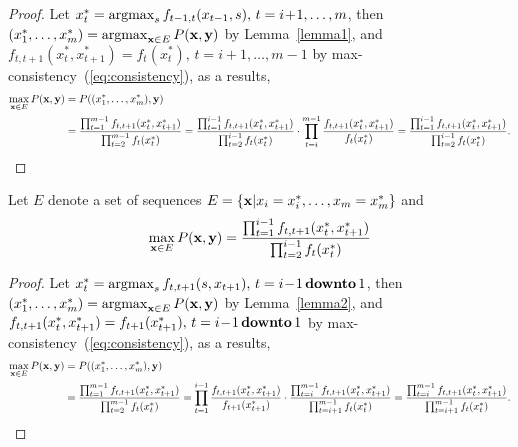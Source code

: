 \begin{proof}
Let $x_t^* = \operatorname*{argmax}_{s} f_{t-1, t}(x_{t-1}, s), \, t = i\!+\!1,\dots,m$, 
then $(x_1^*,\dots,x_m^*) = \operatorname*{argmax}_{\mathbf{x} \in E} P(\mathbf{x},\mathbf{y})$ by Lemma~\ref{lemma1},
and $f_{t,t+1}(x_t^*, x_{t+1}^*) = f_{t}(x_t^*), \, t = i\!+\!1,\dots,m\!-\!1$ by max-consistency~(\ref{eq:consistency}),
as a results,
\begin{align*}
\max_{\x \in E} P(\x,\y) &= P((x_1^*,\dots,x_m^*), \y) \\
&= \frac{\prod_{t=1}^{m-1} f_{t,t+1}(x_t^*, x_{t+1}^*)} {\prod_{t=2}^{m-1} f_t(x_t^*)} %
= \frac{\prod_{t=1}^{i-1} f_{t,t+1}(x_t^*, x_{t+1}^*)} {\prod_{t=2}^{i-1} f_t(x_t^*)} \cdot
  \prod_{t=i}^{m-1} \frac{f_{t,t+1}(x_t^*, x_{t+1}^*)} {f_t(x_t^*)}                   %
= \frac{\prod_{t=1}^{i-1} f_{t,t+1}(x_t^*, x_{t+1}^*)} {\prod_{t=2}^{i-1} f_t(x_t^*)}.
\end{align*}
\end{proof}

\begin{lemma}
\label{lemma4}
Let $E$ denote a set of sequences $E = \{\mathbf{x} |x_i = x_i^*, \dots, x_m = x_m^*\}$ and
\begin{equation*}
\max_{\mathbf{x} \in E} P(\mathbf{x},\mathbf{y}) = \frac{\prod_{t=1}^{i-1} f_{t,t+1}(x_t^*, x_{t+1}^*)} {\prod_{t=2}^{i-1} f_t(x_t^*)}
\end{equation*}
\end{lemma}

\begin{proof}
Let $x_t^* = \operatorname*{argmax}_{s} f_{t, t+1}(s, x_{t+1}), \, t = i\!-\!1 \,\textbf{downto}\, 1$, 
then $(x_1^*,\dots,x_m^*) = \operatorname*{argmax}_{\mathbf{x} \in E} P(\mathbf{x},\mathbf{y})$ by Lemma~\ref{lemma2},
and $f_{t,t+1}(x_t^*, x_{t+1}^*) = f_{t+1}(x_{t+1}^*),\,t = i\!-\!1 \,\textbf{downto}\, 1$ by max-consistency~(\ref{eq:consistency}),
as a results,
\begin{align*}
\max_{\x \in E} P(\x,\y) &= P((x_1^*,\dots,x_m^*), \y) \\
&= \frac{\prod_{t=1}^{m-1} f_{t,t+1}(x_t^*, x_{t+1}^*)} {\prod_{t=2}^{m-1} f_t(x_t^*)} %
= \prod_{t=1}^{i-1} \frac{f_{t,t+1}(x_t^*, x_{t+1}^*)} {f_{t+1}(x_{t+1}^*)}  \cdot
  \frac{\prod_{t=i}^{m-1} f_{t,t+1}(x_t^*, x_{t+1}^*)} {\prod_{t=i+1}^{m-1} f_t(x_t^*)} 
= \frac{\prod_{t=i}^{m-1} f_{t,t+1}(x_t^*, x_{t+1}^*)} {\prod_{t=i+1}^{m-1} f_t(x_t^*)}.
\end{align*}
\end{proof}
